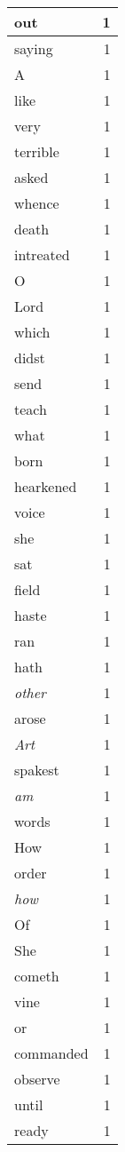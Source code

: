 \begin{center}
\begin{longtable}{l|r}
out & 1\\ \hline 
saying & 1\\ \hline 
A & 1\\ \hline 
like & 1\\ \hline 
very & 1\\ \hline 
terrible & 1\\ \hline 
asked & 1\\ \hline 
whence & 1\\ \hline 
death & 1\\ \hline 
intreated & 1\\ \hline 
O & 1\\ \hline 
Lord & 1\\ \hline 
which & 1\\ \hline 
didst & 1\\ \hline 
send & 1\\ \hline 
teach & 1\\ \hline 
what & 1\\ \hline 
born & 1\\ \hline 
hearkened & 1\\ \hline 
voice & 1\\ \hline 
she & 1\\ \hline 
sat & 1\\ \hline 
field & 1\\ \hline 
haste & 1\\ \hline 
ran & 1\\ \hline 
hath & 1\\ \hline 
\emph{other} & 1\\ \hline 
arose & 1\\ \hline 
\emph{Art} & 1\\ \hline 
spakest & 1\\ \hline 
\emph{am} & 1\\ \hline 
words & 1\\ \hline 
How & 1\\ \hline 
order & 1\\ \hline 
\emph{how} & 1\\ \hline 
Of & 1\\ \hline 
She & 1\\ \hline 
cometh & 1\\ \hline 
vine & 1\\ \hline 
or & 1\\ \hline 
commanded & 1\\ \hline 
observe & 1\\ \hline 
until & 1\\ \hline 
ready & 1\\ \hline 

\end{longtable}
\end{center}
